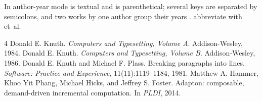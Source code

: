 \documentclass{article}
\begin{document}
In author-year mode \citet{knuth84} is textual and \citep{plass81} is
parenthetical; several keys \citep{knuth84,plass81} are separated by
semicolons, and two works by one author group their years
\citep{knuth84,knuth86}. \citet{hammer14} abbreviate with et~al.

\begin{thebibliography}{4}
 Donald E. Knuth. \emph{Computers and Typesetting, Volume A}. Addison-Wesley, 1984.
 Donald E. Knuth. \emph{Computers and Typesetting, Volume B}. Addison-Wesley, 1986.
 Donald E. Knuth and Michael F. Plass.
  Breaking paragraphs into lines. \emph{Software: Practice and Experience},
  11(11):1119--1184, 1981.
  Matthew A. Hammer, Khoo Yit Phang, Michael Hicks, and Jeffrey S. Foster.
  Adapton: composable, demand-driven incremental computation. In \emph{PLDI},
  2014.
\end{thebibliography}
\end{document}
